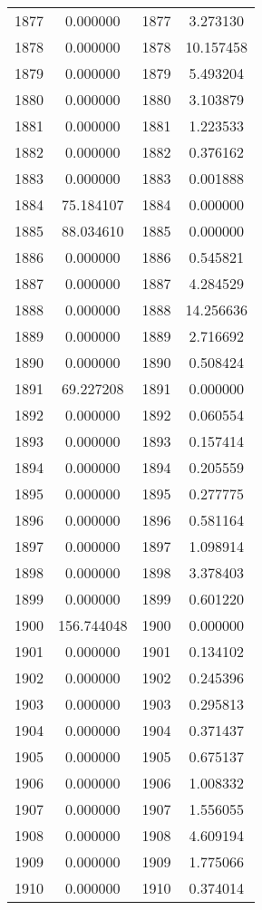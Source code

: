 \documentclass[12pt]{article}
\begin{document}
\begin{longtable}{@{}cccc@{}}
1877 & 0.000000 & 1877 & 3.273130 \\
1878 & 0.000000 & 1878 & 10.157458 \\
1879 & 0.000000 & 1879 & 5.493204 \\
1880 & 0.000000 & 1880 & 3.103879 \\
1881 & 0.000000 & 1881 & 1.223533 \\
1882 & 0.000000 & 1882 & 0.376162 \\
1883 & 0.000000 & 1883 & 0.001888 \\
1884 & 75.184107 & 1884 & 0.000000 \\
1885 & 88.034610 & 1885 & 0.000000 \\
1886 & 0.000000 & 1886 & 0.545821 \\
1887 & 0.000000 & 1887 & 4.284529 \\
1888 & 0.000000 & 1888 & 14.256636 \\
1889 & 0.000000 & 1889 & 2.716692 \\
1890 & 0.000000 & 1890 & 0.508424 \\
1891 & 69.227208 & 1891 & 0.000000 \\
1892 & 0.000000 & 1892 & 0.060554 \\
1893 & 0.000000 & 1893 & 0.157414 \\
1894 & 0.000000 & 1894 & 0.205559 \\
1895 & 0.000000 & 1895 & 0.277775 \\
1896 & 0.000000 & 1896 & 0.581164 \\
1897 & 0.000000 & 1897 & 1.098914 \\
1898 & 0.000000 & 1898 & 3.378403 \\
1899 & 0.000000 & 1899 & 0.601220 \\
1900 & 156.744048 & 1900 & 0.000000 \\
1901 & 0.000000 & 1901 & 0.134102 \\
1902 & 0.000000 & 1902 & 0.245396 \\
1903 & 0.000000 & 1903 & 0.295813 \\
1904 & 0.000000 & 1904 & 0.371437 \\
1905 & 0.000000 & 1905 & 0.675137 \\
1906 & 0.000000 & 1906 & 1.008332 \\
1907 & 0.000000 & 1907 & 1.556055 \\
1908 & 0.000000 & 1908 & 4.609194 \\
1909 & 0.000000 & 1909 & 1.775066 \\
1910 & 0.000000 & 1910 & 0.374014 \\

\end{longtable}
\end{document}
